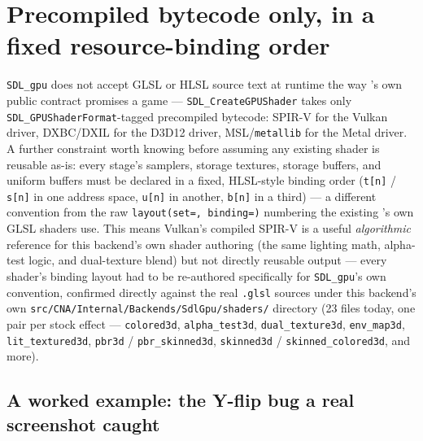 \section{Precompiled bytecode only, in a fixed resource-binding order}

\texttt{SDL\_gpu} does not accept GLSL or HLSL source text at runtime the way
's own public contract promises a game --- \texttt{SDL\_CreateGPUShader}
takes only \texttt{SDL\_GPUShaderFormat}-tagged precompiled bytecode: SPIR-V for the Vulkan
driver, DXBC/DXIL for the D3D12 driver, MSL/\texttt{metallib} for the Metal driver. A further
constraint worth knowing before assuming any existing shader is reusable as-is: every stage's
samplers, storage textures, storage buffers, and uniform buffers must be declared in a fixed,
HLSL-style binding order (\texttt{t[n]} / \texttt{s[n]} in one address space, \texttt{u[n]} in
another, \texttt{b[n]} in a third) --- a different convention from the raw
\texttt{layout(set=, binding=)} numbering the existing 's own
GLSL shaders use. This means Vulkan's compiled SPIR-V is a useful \emph{algorithmic} reference
for this backend's own shader authoring (the same lighting math, alpha-test logic, and
dual-texture blend) but not directly reusable output --- every shader's binding layout had to
be re-authored specifically for \texttt{SDL\_gpu}'s own convention, confirmed directly against
the real \texttt{.glsl} sources under this backend's own
\texttt{src/\allowbreak{}CNA/\allowbreak{}Internal/\allowbreak{}Backends/\allowbreak{}SdlGpu/\allowbreak{}shaders/}
directory (23 files today, one pair per stock effect --- \texttt{colored3d},
\texttt{alpha\_test3d}, \texttt{dual\_texture3d}, \texttt{env\_map3d}, \texttt{lit\_textured3d},
\texttt{pbr3d} / \texttt{pbr\_skinned3d}, \texttt{skinned3d} / \texttt{skinned\_colored3d}, and more).

\subsection{A worked example: the Y-flip bug a real screenshot caught}

